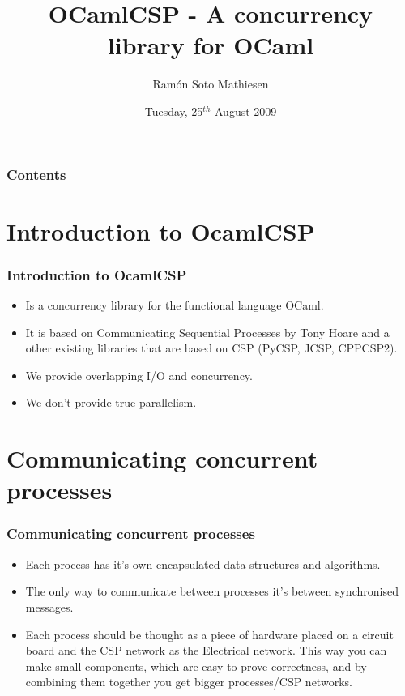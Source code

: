 \documentclass{beamer}
\title[OCamlCSP]{
  OCamlCSP - A concurrency library for OCaml
}
\author[Ramón Soto]{
  Ramón Soto Mathiesen
}
\institute{Computer Science Department \\ Copenhagen University}
\date{Tuesday, 25$^{th}$ August 2009}
\begin{document}
\begin{frame}
 \titlepage
\end{frame}

\begin{frame}
 \frametitle{Contents}
 \setcounter{tocdepth}{2}
 \tableofcontents
\end{frame}

\section[Intro]{Introduction to OcamlCSP}
\begin{frame}
  \frametitle{Introduction to OcamlCSP}
  \begin{itemize}
  \item Is a concurrency library for the functional language OCaml.
  \item It is based on Communicating Sequential Processes by Tony Hoare and
    a other existing libraries that are based on CSP (PyCSP, JCSP, CPPCSP2).
  \item We provide overlapping I/O and concurrency.
  \item We don't provide true parallelism.
  \end{itemize}
\end{frame}

\section[CSP]{Communicating concurrent processes}
\begin{frame}
  \frametitle{Communicating concurrent processes}
  \begin{itemize}
    \item Each process has it's own encapsulated data structures and algorithms.
    \item The only way to communicate between processes it's between synchronised
      messages.
    \item Each process should be thought as a piece of hardware placed on a
      circuit board and the CSP network as the Electrical network. This way you
      can make small components, which are easy to prove correctness, and by
      combining them together you get bigger processes/CSP networks.
  \end{itemize}
\end{frame}
\end{document}
